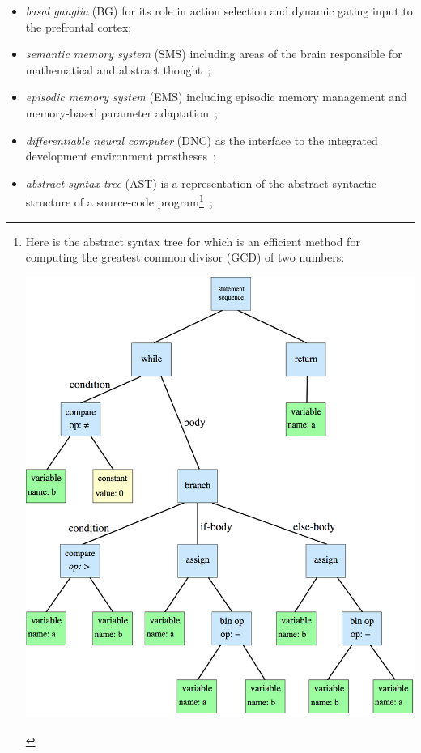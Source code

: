 \begin{itemize}
%
\item {\it{basal ganglia}} (BG) for its role in action selection and dynamic gating input to the prefrontal cortex\cite{OReillyetalLEABRA-16,KrieteetalPNAS-13};
% 
\item {\it{semantic memory system}} (SMS) including areas of the brain responsible for mathematical and abstract thought~\cite{Tulving1972,BinderandDesaiTiCS-11};
%
\item {\it{episodic memory system}} (EMS) including episodic memory management and memory-based parameter adaptation~\cite{SprechmannetalICLR-18,PritzeletalICML-17};
%
\item {\it{differentiable neural computer}} (DNC) as the interface to the integrated development environment prostheses~\cite{GravesetalNATURE-16,GravesetalCoRR-14};
%
\item {\it{abstract syntax-tree}} (AST) is a representation of the abstract syntactic structure of a source-code program\footnote{%
%
  Here is the abstract syntax tree for {} which is an efficient method for computing the greatest common divisor (GCD) of two numbers:
  \begin{center}
    \includegraphics[width=6.0in]{./figures/Euclids_Greatest_Common_Divisor_Method.png}
  \end{center}}~\cite{DevlinetalICLR-18,WangetalCoRR-17};
% 
\end{itemize}

